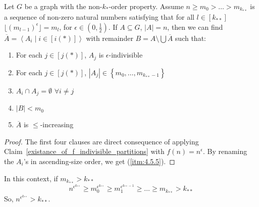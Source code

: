    \lemma[Claim 4.5]\label{existance_of_ordered_epsilon_indivisible_partitions}
    Let $G$ be a graph with the non-$k_{*}$-order property.
    Assume $n \geq m_0 > \dots > m_{k_{**}}$ is a sequence of non-zero natural numbers satisfying that for all $l \in [k_{**}]$
        $\lfloor (m_{l-1})^\epsilon \rfloor = m_l$, for $\epsilon \in (0, \frac{1}{2})$.
    If $A \subseteq G$, $|A| = n$, then we can find $\overline{A} = \left< A_i \mid i \in [i(*)] \right>$ with remainder
        $B = A \setminus \bigcup \overline{A}$ such that:
    \begin{enumerate}  %
        \item \label{itm:4.5.1} For each $j \in [j(*)]$, $A_j$ is $\epsilon$-indivisible
        \item \label{itm:4.5.2} For each $j \in [j(*)]$, $|A_j| \in \left\{ m_0, \dots, m_{k_{**}-1} \right\}$
        \item \label{itm:4.5.3} $A_i \cap A_j = \emptyset$ $\forall i \neq j$
        \item \label{itm:4.5.4} $|B| < m_0$
        \item \label{itm:4.5.5} $\overline{A}$ is $\leq$-increasing
    \end{enumerate}
        \begin{proof}
            The first four clauses are direct consequence of applying Claim~\ref{existance_of_f_indivisible_partitions}
                with $f(n) = n^\epsilon$.
            By renaming the $A_i$'s in ascending-size order, we get (\ref{itm:4.5.5}).
        \end{proof}

    \remark
    In this context, if $m_{k_{**}} > k_{**}$
    \[
        n^{\epsilon^{k_{**}}} \geq m_0^{\epsilon^{k_{**}}} \geq m_1^{\epsilon^{k_{**}-1}} \geq \dots \geq m_{k_{**}} > k_{**}
    \]
    So, $n^{\epsilon^{k_{**}}} > k_{**}$.

